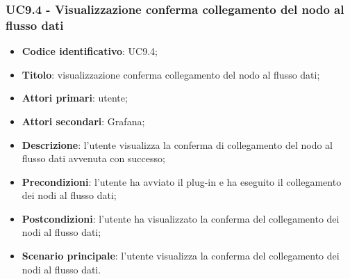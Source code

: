 \subsubsection{UC9.4 - Visualizzazione conferma collegamento del nodo al flusso dati}
\begin{itemize}
	\item \textbf{Codice identificativo}: UC9.4;
	\item \textbf{Titolo}: visualizzazione conferma collegamento del nodo al flusso dati;
	\item \textbf{Attori primari}: utente;
	\item \textbf{Attori secondari}: Grafana\glo;
	\item \textbf{Descrizione}: l'utente visualizza la conferma di collegamento del nodo al flusso dati avvenuta con successo;
	\item \textbf{Precondizioni}: l'utente ha avviato il plug-in e ha eseguito il collegamento dei nodi al flusso dati;
	\item \textbf{Postcondizioni}: l'utente ha visualizzato la conferma del collegamento dei nodi al flusso dati;
	\item \textbf{Scenario principale}: l'utente visualizza la conferma del collegamento dei nodi al flusso dati.
\end{itemize}